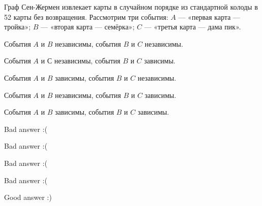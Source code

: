 
\begin{question}
Граф Сен-Жермен извлекает карты в случайном порядке из стандартной
колоды в 52 карты без возвращения. Рассмотрим три события: \(A\) ---
«первая карта --- тройка»; \(B\) --- «вторая карта --- семёрка»; \(C\)
--- «третья карта --- дама пик».
\begin{answerlist}
  \item События \(A\) и \(B\) независимы, события \(B\) и \(C\) независимы.
  \item События \(A\) и \(С\) независимы, события \(B\) и \(C\) зависимы.
  \item События \(A\) и \(B\) зависимы, события \(B\) и \(C\) независимы.
  \item События \(A\) и \(B\) независимы, события \(B\) и \(C\) зависимы.
  \item События \(A\) и \(B\) зависимы, события \(B\) и \(C\) зависимы.
\end{answerlist}
\end{question}

\begin{solution}
\begin{answerlist}
  \item Bad answer :(
  \item Bad answer :(
  \item Bad answer :(
  \item Bad answer :(
  \item Good answer :)
\end{answerlist}
\end{solution}


